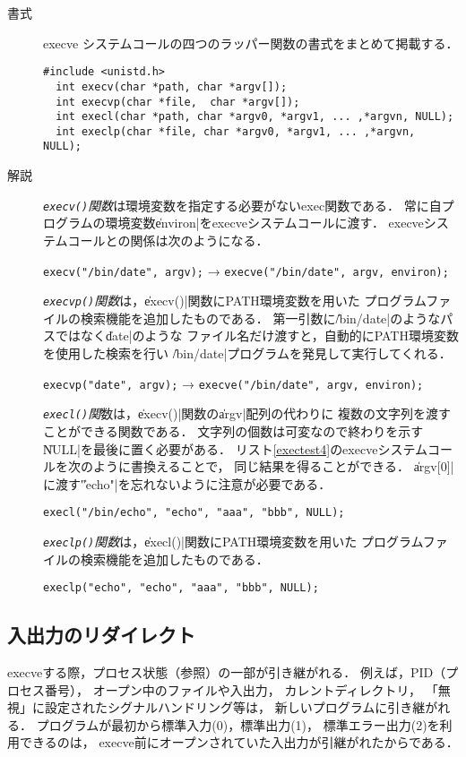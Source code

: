 \begin{description}
\item[書式]
  execve システムコールの四つのラッパー関数の書式をまとめて掲載する．
\begin{lstlisting}[numbers=none]
  #include <unistd.h>
  int execv(char *path, char *argv[]);
  int execvp(char *file,  char *argv[]);
  int execl(char *path, char *argv0, *argv1, ... ,*argvn, NULL);
  int execlp(char *file, char *argv0, *argv1, ... ,*argvn, NULL);
\end{lstlisting}

\item [解説]
  \emph{\texttt{execv()}関数}は環境変数を指定する必要がないexec関数である．
  常に自プログラムの環境変数\|environ|をexecveシステムコールに渡す．
  execveシステムコールとの関係は次のようになる．

  \centerline{\texttt{execv("/bin/date", argv);}
    →  \texttt{execve("/bin/date", argv, environ);}}

  \emph{\texttt{execvp()}関数}は，\|execv()|関数にPATH環境変数を用いた
  プログラムファイルの検索機能を追加したものである．
  第一引数に\|/bin/date|のようなパスではなく\|date|のような
  ファイル名だけ渡すと，自動的にPATH環境変数を使用した検索を行い
  \|/bin/date|プログラムを発見して実行してくれる．
  
  \centerline{\texttt{execvp("date", argv);}
    →  \texttt{execve("/bin/date", argv, environ);}}

  \emph{\texttt{execl()}関}数は，\|execv()|関数の\|argv|配列の代わりに
  複数の文字列を渡すことができる関数である．
  文字列の個数は可変なので終わりを示す\| NULL|を最後に置く必要がある．
  リスト\ref{exectest4}のexecveシステムコールを次のように書換えることで，
  同じ結果を得ることができる．
  \|argv[0]|に渡す\|"echo"|を忘れないように注意が必要である．

  \centerline{\texttt{execl("/bin/echo", "echo", "aaa", "bbb", NULL);}}

  \emph{\texttt{execlp()}関数}は，\|execl()|関数にPATH環境変数を用いた
  プログラムファイルの検索機能を追加したものである．

  \centerline{\texttt{execlp("echo", "echo", "aaa", "bbb", NULL);}}

\end{description}

\subsection{入出力のリダイレクト}
execveする際，プロセス状態（参照）の一部が引き継がれる．
例えば，PID（プロセス番号），
オープン中のファイルや入出力，
カレントディレクトリ，
「無視」に設定されたシグナルハンドリング等は，
新しいプログラムに引き継がれる．
プログラムが最初から標準入力(0)，標準出力(1)，
標準エラー出力(2)を利用できるのは，
execve前にオープンされていた入出力が引継がれたからである．

